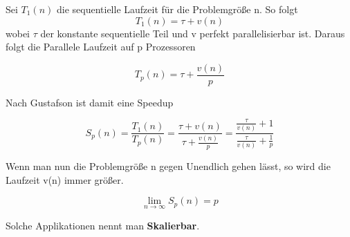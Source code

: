 \documentclass[twocolumn, a4paper, 10pt, DIV12]{scrreprt}
\begin{document}
Sei \(T_1(n)\) die sequentielle Laufzeit für die Problemgröße n. So folgt
\[ T_1(n) = \tau + v(n)\]
wobei \(\tau\) der konstante sequentielle Teil und v perfekt parallelisierbar ist. Daraus folgt die
Parallele Laufzeit auf p Prozessoren

\[ T_p(n) = \tau + \frac{v(n)}{p}\]

Nach Gustafson ist damit eine Speedup

\[ S_p(n) = \frac{T_1(n)}{T_p(n)} = \frac{\tau + v(n)}{\tau + \frac{v(n)}{p}} = \frac{\frac{\tau}{v(n)} + 1}{\frac{\tau}{v(n)} + \frac{1}{p}} \]

Wenn man nun die Problemgröße n gegen Unendlich gehen lässt, so wird die Laufzeit v(n) immer größer.

\[ \lim_{n \rightarrow \infty} S_p(n) = p\]

Solche Applikationen nennt man \textbf{Skalierbar}.
\end{document}
